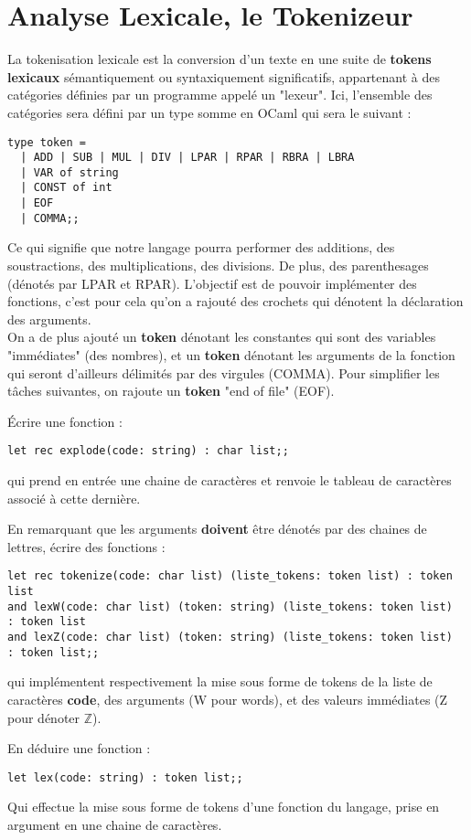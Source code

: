 \documentclass[12pt,letterpaper,onecolumn]{exam}
\begin{document}
\section{Analyse Lexicale, le Tokenizeur}
La tokenisation lexicale est la conversion d'un texte en une suite de \textbf{tokens lexicaux} sémantiquement ou syntaxiquement significatifs, appartenant à des catégories définies par un programme appelé un "lexeur". Ici, l'ensemble des catégories sera défini par un type somme en OCaml qui sera le suivant :
\begin{verbatim}
type token =
  | ADD | SUB | MUL | DIV | LPAR | RPAR | RBRA | LBRA
  | VAR of string
  | CONST of int
  | EOF
  | COMMA;;
\end{verbatim}
Ce qui signifie que notre langage pourra performer des additions, des soustractions, des multiplications, des divisions. De plus, des parenthesages (dénotés par LPAR et RPAR). L'objectif est de pouvoir implémenter des fonctions, c'est pour cela qu'on a rajouté des crochets qui dénotent la déclaration des arguments.\\
On a de plus ajouté un \textbf{token} dénotant les constantes qui sont des variables "immédiates" (des nombres), et un \textbf{token} dénotant les arguments de la fonction qui seront d'ailleurs délimités par des virgules (COMMA). Pour simplifier les tâches suivantes, on rajoute un \textbf{token} "end of file" (EOF).
\begin{questions}
\question Écrire une fonction : 
\begin{verbatim}
let rec explode(code: string) : char list;;
\end{verbatim}
qui prend en entrée une chaine de caractères et renvoie le tableau de caractères associé à cette dernière.

\question En remarquant que les arguments \textbf{doivent} être dénotés par des chaines de lettres, écrire des fonctions :
\begin{verbatim}
let rec tokenize(code: char list) (liste_tokens: token list) : token list
and lexW(code: char list) (token: string) (liste_tokens: token list)  : token list
and lexZ(code: char list) (token: string) (liste_tokens: token list)  : token list;;
\end{verbatim}
qui implémentent respectivement la mise sous forme de tokens de la liste de caractères \textbf{code}, des arguments (W pour words), et des valeurs immédiates (Z pour dénoter $\mathbb{Z}$).

\question En déduire une fonction :
\begin{verbatim}
let lex(code: string) : token list;;
\end{verbatim}
Qui effectue la mise sous forme de tokens d'une fonction du langage, prise en argument en une chaine de caractères.
\end{questions}
\end{document}
